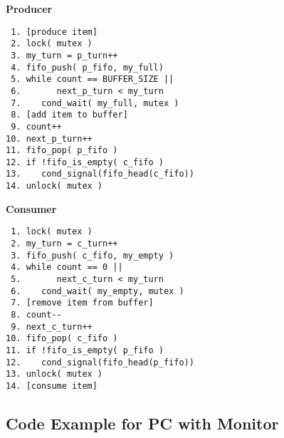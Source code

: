 \begin{multicols}{2}
    \small
    \textbf{Producer}
    \begin{verbatim}
 1. [produce item]
 2. lock( mutex )
 3. my_turn = p_turn++
 4. fifo_push( p_fifo, my_full)
 5. while count == BUFFER_SIZE ||
 6.       next_p_turn < my_turn
 7.    cond_wait( my_full, mutex )
 8. [add item to buffer]
 9. count++
10. next_p_turn++
11. fifo_pop( p_fifo )
12. if !fifo_is_empty( c_fifo )
13.    cond_signal(fifo_head(c_fifo))
14. unlock( mutex )
    \end{verbatim}
    \columnbreak
    \textbf{Consumer}\vspace{-2em}
    \begin{verbatim}
 1. lock( mutex )
 2. my_turn = c_turn++
 3. fifo_push( c_fifo, my_empty )
 4. while count == 0 ||
 5.       next_c_turn < my_turn
 6.    cond_wait( my_empty, mutex )
 7. [remove item from buffer]
 8. count--
 9. next_c_turn++
10. fifo_pop( c_fifo )
11. if !fifo_is_empty( p_fifo )
12.    cond_signal(fifo_head(p_fifo))
13. unlock( mutex )
14. [consume item]
    \end{verbatim}
\end{multicols}
\vspace{-2em}

\subsection*{Code Example for PC with Monitor}

